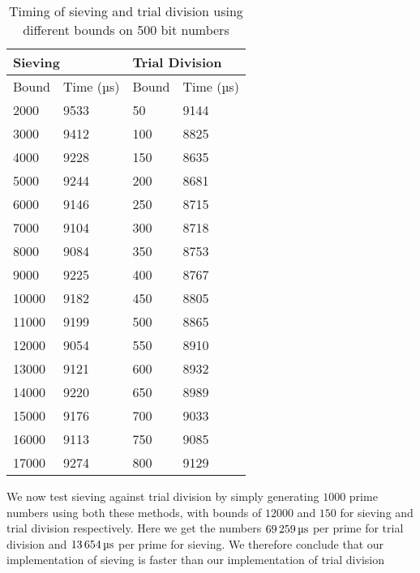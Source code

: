   \begin{table}[H]
    \begin{center}
      \begin{tabular}[c]{ll|ll}
        \hline
        \multicolumn{2}{l|}{\textbf{Sieving}} & 
        \multicolumn{2}{l}{\textbf{Trial Division}} \\
        \hline
        Bound & Time (µs) & Bound & Time (µs) \\
        \hline
         2000   &  9533   &  50    &  9144 \\
         3000   &  9412   &  100   &  8825 \\
         4000   &  9228   &  150   &  8635 \\
         5000   &  9244   &  200   &  8681 \\
         6000   &  9146   &  250   &  8715 \\
         7000   &  9104   &  300   &  8718 \\
         8000   &  9084   &  350   &  8753 \\
         9000   &  9225   &  400   &  8767 \\
         10000  &  9182   &  450   &  8805 \\
         11000  &  9199   &  500   &  8865 \\
         12000  &  9054   &  550   &  8910 \\
         13000  &  9121   &  600   &  8932 \\
         14000  &  9220   &  650   &  8989 \\
         15000  &  9176   &  700   &  9033 \\
         16000  &  9113   &  750   &  9085 \\
         17000  &  9274   &  800   &  9129 \\
        \hline
      \end{tabular}
    \end{center}
    \caption{Timing of sieving and trial division using different bounds on 500 bit numbers}\label{tab:optimal-bounds}
  \end{table}

  We now test sieving against trial division by simply generating $1000$ prime numbers using both these methods, with bounds of $12000$ and $150$ for sieving and trial division respectively.
  Here we get the numbers $\SI{69259}{\SIUnitSymbolMicro \second}$ per prime for trial division and $\SI{13654}{\SIUnitSymbolMicro \second}$ per prime for sieving.
  We therefore conclude that our implementation of sieving is faster than our implementation of trial division
  
